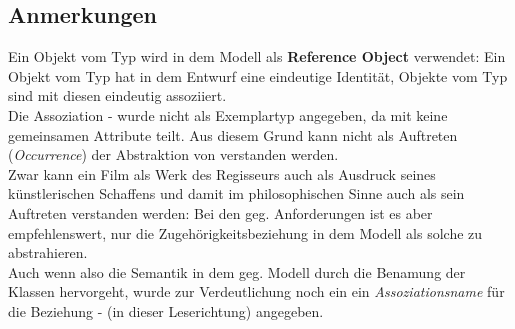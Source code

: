 \subsection*{Anmerkungen}
Ein Objekt vom Typ  wird in dem Modell als \textbf{Reference Object} verwendet: Ein Objekt vom Typ  hat in dem Entwurf eine eindeutige Identität, Objekte vom Typ  sind mit diesen eindeutig assoziiert.\\
Die Assoziation  -  wurde nicht als Exemplartyp angegeben, da  mit  keine gemeinsamen Attribute teilt.
Aus diesem Grund kann  nicht als Auftreten (\textit{Occurrence}) der Abstraktion von  verstanden werden.\\
Zwar kann ein Film als Werk des Regisseurs auch als Ausdruck seines künstlerischen Schaffens und damit im philosophischen Sinne auch als sein Auftreten verstanden werden: Bei den geg. Anforderungen ist es aber empfehlenswert, nur die Zugehörigkeitsbeziehung in dem Modell als solche zu abstrahieren.\\
Auch wenn also die Semantik in dem geg. Modell durch die Benamung der Klassen hervorgeht, wurde zur Verdeutlichung noch ein ein \textit{Assoziationsname} für die Beziehung  -  (in dieser Leserichtung) angegeben.
